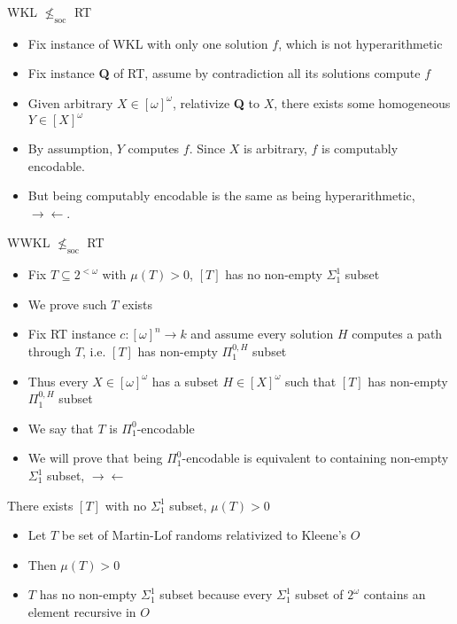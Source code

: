 \documentclass[notes]{beamer}
\begin{document}
\begin{frame}{WKL $\nleq_{\text{soc}}$ RT}
  \begin{itemize}
    \item Fix instance of WKL with only one solution $f$, which is
      not hyperarithmetic
    \item Fix instance \textbf{Q} of RT, assume by contradiction all
      its solutions compute $f$ 
    \item Given arbitrary $X\in[\omega]^\omega$, relativize \textbf{Q} to
      $X$, there exists some homogeneous $Y\in[X]^\omega$
    \item By assumption, $Y$ computes $f$. Since $X$ is arbitrary, $f$ is
      computably encodable.
    \item But being computably encodable is the same as being
      hyperarithmetic, $\rightarrow\leftarrow$.
  \end{itemize}
\end{frame}

\begin{frame}{WWKL $\nleq_{\text{soc}}$ RT}
  \begin{itemize}
    \item Fix $T\subseteq 2^{<\omega}$ with $\mu(T)>0$, $[T]$
      has no non-empty $\Sigma_1^1$ subset
    \item We prove such $T$ exists
    \item Fix RT instance $c:[\omega]^n\rightarrow k$ and assume every
      solution $H$ computes a path through $T$, i.e. $[T]$ has non-empty
      $\Pi_1^{0,H}$ subset
    \item Thus every $X\in[\omega]^\omega$ has a subset
      $H\in[X]^\omega$ such that $[T]$ has non-empty $\Pi_1^{0,H}$ subset
    \item We say that $T$ is $\Pi_1^0$-encodable
    \item We will prove that being $\Pi_1^0$-encodable is equivalent to
      containing non-empty $\Sigma_1^1$ subset, $\rightarrow\leftarrow$
  \end{itemize}
\end{frame}

\begin{frame}{There exists $[T]$ with no $\Sigma_1^1$ subset, $\mu(T)>0$}
  \begin{itemize}
    \item Let $T$ be set of Martin-Lof randoms relativized to Kleene's $O$
    \item Then $\mu(T)>0$
    \item $T$ has no non-empty $\Sigma_1^1$ subset because every
      $\Sigma_1^1$ subset of $2^\omega$ contains an element recursive in
      $O$
  \end{itemize}
\end{frame}
\end{document}
